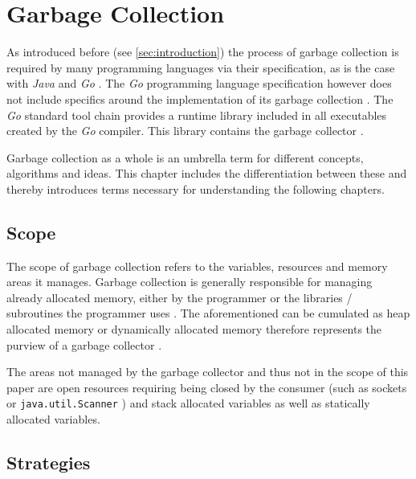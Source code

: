 \section{Garbage Collection}

As introduced before (see \autoref{sec:introduction}) the process of garbage
collection is required by many programming languages via their specification,
as is the case with \textit{Java} \cite[Chapter 1.
Introduction]{java_language_spec_2023} and \textit{Go}
\cite[Introduction]{go_spec_2023}. The \textit{Go} programming language
specification however does not include specifics around the implementation of
its garbage collection \cite[Introduction]{go_gcguide_2022}. The \textit{Go}
standard tool chain provides a runtime library included in all executables
created by the \textit{Go} compiler. This library contains the garbage
collector \cite[Introduction]{go_gcguide_2022}.

Garbage collection as a whole is an umbrella term for
different concepts, algorithms and ideas. This chapter includes the
differentiation between these and thereby introduces terms necessary for
understanding the following chapters. 

\subsection{Scope}

The scope of garbage collection refers to the variables, resources and memory
areas it manages. Garbage collection is generally responsible for managing
already allocated memory, either by the programmer or the libraries /
subroutines the programmer uses \cite[Abstract]{learned-gc_2020}. The
aforementioned can be cumulated as heap allocated memory or dynamically
allocated memory therefore represents the purview of a garbage collector
\cite[1 Introduction]{age-based-gc_1999}.

The areas not managed by the garbage collector and thus not in the scope of
this paper are open resources requiring being closed by the consumer (such as
sockets or \texttt{java.util.Scanner} \cite[close]{java-util-scanner}) and
stack allocated variables as well as statically allocated variables.

\subsection{Strategies}

